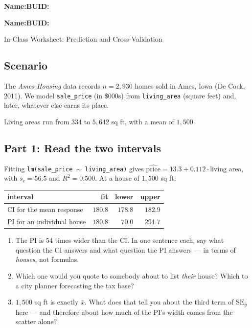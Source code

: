\documentclass{article}
\newcommand{\blankline}[1]{\underline{\hspace{#1}}}
\begin{document}
\noindent\textbf{Name:}\blankline{2.25in}\hfill\textbf{BUID:}\blankline{1.55in}

\medskip

\noindent\textbf{Name:}\blankline{2.25in}\hfill\textbf{BUID:}\blankline{1.55in}\newline

\begin{center}
 \Large In-Class Worksheet: Prediction and Cross-Validation
\end{center}

\subsection*{Scenario}
The \emph{Ames Housing} data records $n = 2{,}930$ homes sold in Ames, Iowa (De Cock, 2011). We model \texttt{sale\_price} (in \$000s) from \texttt{living\_area} (square feet) and, later, whatever else earns its place.

\smallskip
Living areas run from $334$ to $5{,}642$ sq ft, with a mean of $1{,}500$.

\subsection*{Part 1: Read the two intervals}

Fitting \texttt{lm(sale\_price $\sim$ living\_area)} gives $\widehat{\text{price}} = 13.3 + 0.112 \cdot \text{living\_area}$, with $s_e = 56.5$ and $R^2 = 0.500$. At a house of $1{,}500$ sq ft:

\begin{center}
\renewcommand{\arraystretch}{1.3}
\begin{tabular}{lrrr}
\toprule
interval & fit & lower & upper \\
\midrule
CI for the mean response & $180.8$ & $178.8$ & $182.9$ \\
PI for an individual house & $180.8$ & $70.0$ & $291.7$ \\
\bottomrule
\end{tabular}
\end{center}

\begin{enumerate}[label={\bfseries (\Alph*)},itemsep=.8em]
\item The PI is $54$ times wider than the CI. In one sentence each, say what question the CI answers and what question the PI answers --- in terms of \emph{houses}, not formulas. \\[3.5em]
\item Which one would you quote to somebody about to list \emph{their} house? Which to a city planner forecasting the tax base? \\[3.5em]
\item $1{,}500$ sq ft is exactly $\bar x$. What does that tell you about the third term of $\mathrm{SE}_{\hat y}$ here --- and therefore about how much of the PI's width comes from the scatter alone? \\[3.5em]
\end{enumerate}
\end{document}
